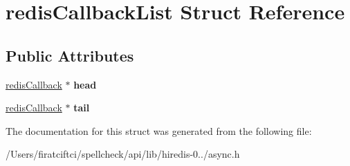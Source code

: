 \hypertarget{structredis_callback_list}{}\section{redis\+Callback\+List Struct Reference}
\label{structredis_callback_list}
\subsection*{Public Attributes}
\begin{DoxyCompactItemize}
\item 
\mbox{\label{structredis_callback_list_aaa0d44375e588947eddbf6745c855cfa}} 
\mbox{\hyperlink{structredis_callback}{redis\+Callback}} $\ast$ {\bfseries head}
\item 
\mbox{\label{structredis_callback_list_ae2b4f074228f4284118df9814135c3bf}} 
\mbox{\hyperlink{structredis_callback}{redis\+Callback}} $\ast$ {\bfseries tail}
\end{DoxyCompactItemize}


The documentation for this struct was generated from the following file\+:\begin{DoxyCompactItemize}
\item 
/\+Users/firatciftci/spellcheck/api/lib/hiredis-\/0../async.\+h\end{DoxyCompactItemize}
